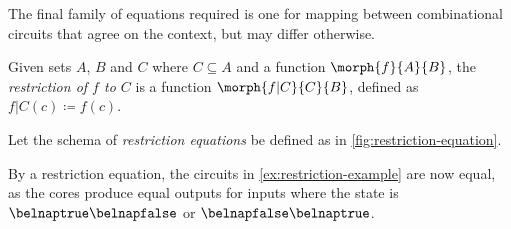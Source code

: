 The final family of equations required is one for mapping between combinational
circuits that agree on the context, but may differ otherwise.

\begin{notation}
    Given sets \(A\), \(B\) and \(C\) where \(C \subseteq A\) and a function
    \(\morph{f}{A}{B}\), the \emph{restriction of \(f\) to \(C\)} is a function
    \(\morph{f|C}{C}{B}\), defined as \(f|C(c) \coloneqq f(c)\).
\end{notation}

\begin{definition}
    Let the schema of \emph{restriction equations} be defined as in
    \cref{fig:restriction-equation}.
\end{definition}

\begin{example}
    By a restriction equation, the circuits in \cref{ex:restriction-example} are
    now equal, as the cores produce equal outputs for inputs where the state is
    \(\belnaptrue\belnapfalse\) or \(\belnapfalse\belnaptrue\).
\end{example}
